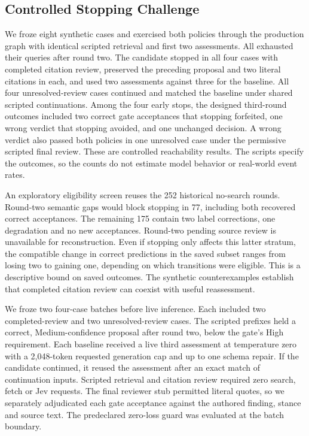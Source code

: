 \documentclass[conference]{IEEEtran}
\begin{document}
\subsection{Controlled Stopping Challenge}
We froze eight synthetic cases and exercised both policies through the production graph with identical scripted retrieval and first two assessments. All exhausted their queries after round two. The candidate stopped in all four cases with completed citation review, preserved the preceding proposal and two literal citations in each, and used two assessments against three for the baseline. All four unresolved-review cases continued and matched the baseline under shared scripted continuations. Among the four early stops, the designed third-round outcomes included two correct gate acceptances that stopping forfeited, one wrong verdict that stopping avoided, and one unchanged decision. A wrong verdict also passed both policies in one unresolved case under the permissive scripted final review. These are controlled reachability results. The scripts specify the outcomes, so the counts do not estimate model behavior or real-world event rates.

An exploratory eligibility screen reuses the 252 historical no-search rounds. Round-two semantic gaps would block stopping in 77, including both recovered correct acceptances. The remaining 175 contain two label corrections, one degradation and no new acceptances. Round-two pending source review is unavailable for reconstruction. Even if stopping only affects this latter stratum, the compatible change in correct predictions in the saved subset ranges from losing two to gaining one, depending on which transitions were eligible. This is a descriptive bound on saved outcomes. The synthetic counterexamples establish that completed citation review can coexist with useful reassessment.

We froze two four-case batches before live inference. Each included two completed-review and two unresolved-review cases. The scripted prefixes held a correct, Medium-confidence proposal after round two, below the gate's High requirement. Each baseline received a live third assessment at temperature zero with a 2,048-token requested generation cap and up to one schema repair. If the candidate continued, it reused the assessment after an exact match of continuation inputs. Scripted retrieval and citation review required zero search, fetch or Jev requests. The final reviewer stub permitted literal quotes, so we separately adjudicated each gate acceptance against the authored finding, stance and source text. The predeclared zero-loss guard was evaluated at the batch boundary.
\end{document}
